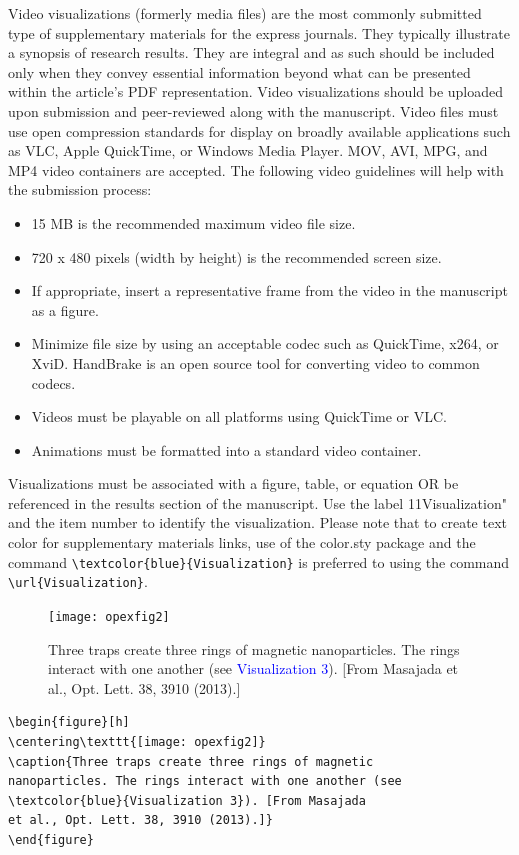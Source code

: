 \documentclass[10pt,letterpaper]{article}
\begin{document}
Video visualizations (formerly media files) are the most commonly submitted type of supplementary materials for the express journals. They typically illustrate a synopsis of research results. They are integral and as such should be included only when they convey essential information beyond what can be presented within the article's PDF representation. Video visualizations should be uploaded upon submission and peer-reviewed along with the manuscript. Video files must use open compression standards for display on broadly available applications such as VLC, Apple QuickTime, or Windows Media Player. MOV, AVI, MPG, and MP4 video containers are accepted. The following video guidelines will help with the submission process:

\begin{itemize}
\item 15 MB is the recommended maximum video file size.
\item 720 x 480 pixels (width by height) is the recommended screen size.
\item If appropriate, insert a representative frame from the video in the manuscript as a figure.
\item Minimize file size by using an acceptable codec such as QuickTime, x264, or XviD. HandBrake is an open source tool for converting video to common codecs. 
\item Videos must be playable on all platforms using QuickTime or VLC.
\item Animations must be formatted into a standard video container.
\end{itemize}

Visualizations must be associated with a figure, table, or equation OR be referenced in the results section of the manuscript. Use the label 11Visualization" and the item number to identify the visualization. Please note that to create text color for supplementary materials links, use of the color.sty package and the command \verb|\textcolor{blue}{Visualization}| is preferred to using the command \verb|\url{Visualization}|.

\newpage

\begin{figure}[h]
\centering\texttt{[image: opexfig2]}
\caption{Three traps create three rings of magnetic nanoparticles. The rings interact with one another (see \textcolor{blue}{Visualization 3}). [From Masajada et al., Opt. Lett. 38, 3910 (2013).]}
\end{figure}

\begin{verbatim}
\begin{figure}[h]
\centering\texttt{[image: opexfig2]}
\caption{Three traps create three rings of magnetic 
nanoparticles. The rings interact with one another (see 
\textcolor{blue}{Visualization 3}). [From Masajada 
et al., Opt. Lett. 38, 3910 (2013).]}
\end{figure}
\end{verbatim}
\end{document}
